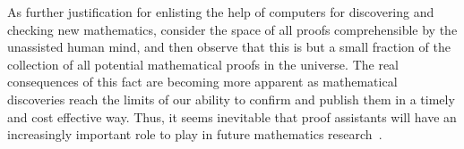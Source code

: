 \documentclass[11pt]{amsart}  %
\begin{document}
As further justification for enlisting the help of computers for discovering and checking new mathematics, consider the space of all proofs comprehensible by the unassisted human mind, and then observe that this is but a small fraction of the collection of all potential mathematical proofs in the universe. The real consequences of this fact are becoming more apparent as mathematical discoveries reach the limits of our ability to confirm and publish them in a timely and cost effective way. Thus, it seems inevitable that proof assistants will have an increasingly important role to play in future mathematics research~\cite{harris:2015}.


\end{document}
